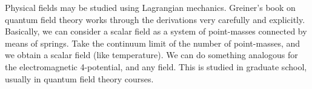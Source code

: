 Physical fields may be studied using Lagrangian mechanics. Greiner's
book on quantum field theory works through the derivations very
carefully and explicitly. Basically, we can consider a scalar field as a
system of point-masses connected by means of springs. Take the continuum
limit of the number of point-masses, and we obtain a scalar field (like
temperature). We can do something analogous for the electromagnetic
4-potential, and any field. This is studied in graduate school, usually
in quantum field theory courses.